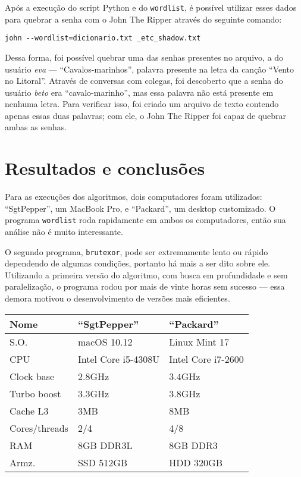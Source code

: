 \documentclass{sig-alternate-05-2015}
\begin{document}
Após a execução do script Python e do \texttt{wordlist}, é possível utilizar esses dados para quebrar a senha com o John The Ripper através do seguinte comando:

\begin{verbatim}
john --wordlist=dicionario.txt _etc_shadow.txt
\end{verbatim}

Dessa forma, foi possível quebrar uma das senhas presentes no arquivo, a do usuário \textit{eva} — ``Cavalos-marinhos'', palavra presente na letra da canção ``Vento no Litoral''.
Através de conversas com colegas, foi descoberto que a senha do usuário \textit{beto} era ``cavalo-marinho'', mas essa palavra não está presente em nenhuma letra.
Para verificar isso, foi criado um arquivo de texto contendo apenas essas duas palavras; com ele, o John The Ripper foi capaz de quebrar ambas as senhas.

\section{Resultados e conclusões}

Para as execuções dos algoritmos, dois computadores foram utilizados: ``SgtPepper'', um MacBook Pro, e ``Packard'', um desktop customizado.
O programa \texttt{wordlist} roda rapidamente em ambos os computadores, então sua análise não é muito interessante.

O segundo programa, \texttt{brutexor}, pode ser extremamente lento ou rápido dependendo de algumas condições, portanto há mais a ser dito sobre ele.
Utilizando a primeira versão do algoritmo, com busca em profundidade e sem paralelização, o programa rodou por mais de vinte horas sem sucesso — essa demora motivou o desenvolvimento de versões mais eficientes.

\begin{center}
  \begin{tabular}{ l | l | l }
    \hline
    \textbf{Nome} & ``SgtPepper'' & ``Packard'' \\ \hline \hline
    S.O. & macOS 10.12 & Linux Mint 17 \\ \hline
    CPU & Intel Core i5-4308U & Intel Core i7-2600 \\ \hline
    Clock base & 2.8GHz & 3.4GHz \\ \hline
    Turbo boost & 3.3GHz & 3.8GHz \\ \hline
    Cache L3 & 3MB & 8MB \\ \hline
    Cores/threads & 2/4 & 4/8 \\ \hline
    RAM & 8GB DDR3L & 8GB DDR3 \\ \hline
    Armz. & SSD 512GB & HDD 320GB \\ \hline
    \hline
  \end{tabular}
\end{center}
\end{document}
